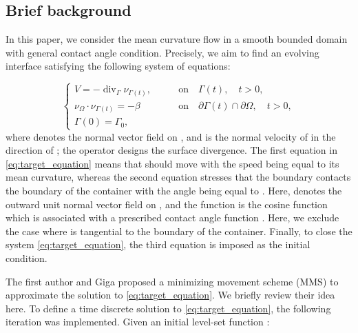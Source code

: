 \documentclass[11pt]{article}
\makeatletter
\numberwithin{equation}{section}
\newcommand{\R}{\mathbb{R}}
\def\ge{\geqslant}
\newcounter{mathrecordid}
\newcommand{\mathboxbegin}[1]{%
  \stepcounter{mathrecordid}%
  \immediate\write\mathrecords{\themathrecordid,#1}%
  \special{pdf:bann << /Type /Annot /Subtype /Link /Border [0 0 0]
    /MathBoxID \themathrecordid /F 2
    /A << /S /URI /URI (urn:mathbox:\themathrecordid) >> >>}}
\newcommand{\mathboxinlineplain}[1]{$#1$}
\newcommand{\mathboxinline}[1]{%
  $\mathboxbegin{inline}%
  \special{pdf:literal direct /MathBoxBegin\themathrecordid\space MP}%
  #1\special{pdf:literal direct /MathBoxEnd\themathrecordid\space MP}%
  \special{pdf:eann}$}
\newcommand{\recordmath}{%
  \ifmeasuring@\expandafter\mathboxinlineplain
  \else\expandafter\mathboxinline\fi}
\makeatother
\begin{document}
\subsection{Brief background}

In this paper, we consider the mean curvature flow in a smooth bounded domain \recordmath{\Omega\subset\R^d\,(d\ge 2)} with general contact angle condition. Precisely, we aim to find an evolving interface \recordmath{\{\Gamma(t)\}_{t\ge 0}} satisfying the following system of equations:

\begin{equation}
\label{eq:target_equation}
    \begin{cases}
    V = - \operatorname{div}_{\Gamma}\nu_{\Gamma(t)},&\qquad \mbox{on}\quad \Gamma(t),\quad t > 0,\\
    \nu_\Omega\cdot\nu_{\Gamma(t)} = -\beta & \qquad\mbox{on}\quad \partial\Gamma(t)\cap \partial\Omega,\quad t > 0,\\
    \Gamma(0) = \Gamma_0,
    \end{cases}
\end{equation}
where \recordmath{\nu_{\Gamma(t)}} denotes the normal vector field on \recordmath{\Gamma(t)}, and \recordmath{V} is the normal velocity of \recordmath{\Gamma(t)} in the direction of \recordmath{\nu_{\Gamma(t)}}; the operator \recordmath{\operatorname{div}_\Gamma} designs the surface divergence. The first equation in \eqref{eq:target_equation} means that \recordmath{\Gamma(t)} should move with the speed being equal to its mean curvature, whereas the second equation stresses that the boundary \recordmath{\partial\Gamma(t)} contacts the boundary \recordmath{\partial\Omega} of the container \recordmath{\Omega} with the angle being equal to \recordmath{\arccos{(-\beta)}}. Here, \recordmath{\nu_\Omega} denotes the outward unit normal vector field on \recordmath{\partial\Omega}, and the function \recordmath{\beta:\partial\Omega\to(-1,1)} is the cosine function which is associated with a prescribed contact angle function \recordmath{\theta:\partial\Omega\to(0,\pi)}. Here, we exclude the case where \recordmath{\Gamma(t)} is tangential to the boundary of the container. Finally, to close the system \eqref{eq:target_equation}, the third equation is imposed as the initial condition.

The first author and Giga \cite{EG24} proposed a minimizing movement scheme (MMS) to approximate the solution to \eqref{eq:target_equation}. We briefly review their idea here. To define a time discrete solution to \eqref{eq:target_equation}, the following iteration was implemented. Given an initial level-set function \recordmath{u_0}:
\end{document}
